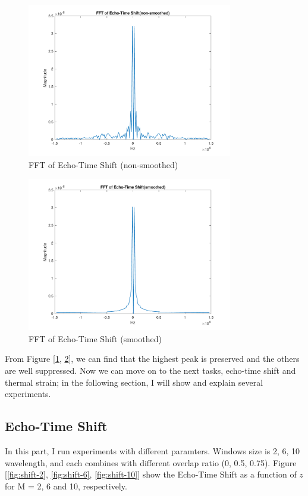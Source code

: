 \documentclass{article}
\begin{document}
\begin{figure}[H]
    \centering
    \includegraphics[width=0.8\textwidth]{src/fft_non.pdf}
    \caption{FFT of Echo-Time Shift (non-smoothed)}
    \label{fig:fft-non}
\end{figure}
\begin{figure}[H]
    \centering
    \includegraphics[width=0.8\textwidth]{src/fft.pdf}
    \caption{FFT of Echo-Time Shift (smoothed)}
    \label{fig:fft}
\end{figure}
From Figure [\ref{fig:fft-non}, \ref{fig:fft}], we can find that the highest peak is preserved and the others are well 
suppressed. Now we can move on to the next tasks, echo-time shift and thermal strain; in the following section, I will
show and explain several experiments.

\subsection{Echo-Time Shift}
In this part, I run experiments with different paramters. Windows size is 2, 6, 10 wavelength, and each combines with different 
overlap ratio (0, 0.5, 0.75). Figure [\ref{fig:shift-2}, \ref{fig:shift-6}, \ref{fig:shift-10}] show the Echo-Time Shift
as a function of $z$ for M = 2, 6 and 10, respectively.
\end{document}
